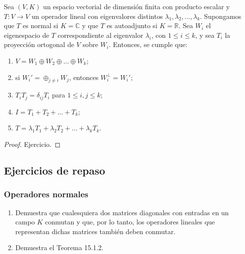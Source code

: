 \documentclass[12pt,dvipsnames]{article}
\newenvironment{teorema}[2][Teorema]{\begin{trivlist}
\item[\hskip \labelsep {\bfseries #1}\hskip \labelsep {\bfseries #2.}]}{\end{trivlist}}
\begin{document}
\begin{teorema} {15.3.1 (Teorema espectral)}
Sea $(V,K)$ un espacio vectorial de dimensión finita con producto escalar y $T:V\to V$ un operador lineal con eigenvalores distintos $\lambda_1,\lambda_2,...,\lambda_k$. Supongamos que $T$ es normal si $K=\mathbb{C}$ y que $T$ es autoadjunto si $K=\mathbb{R}$. Sea $W_i$ el eigenespacio de $T$ correspondiente al eigenvalor $\lambda_i$, con $1\leq i\leq k$, y sea $T_i$ la proyección ortogonal de $V$ sobre $W_i$. Entonces, se cumple que:
\begin{enumerate}[label=\alph*)]
    \item $V = W_1 \oplus W_2 \oplus ... \oplus W_k$;
    \item si $W_i'=\oplus_{j\neq i}W_j$, entonces $W_i^\perp=W_i'$;
    \item $T_i T_j = \delta_{ij}T_i$ para $1\leq i,j\leq k$;
    \item $I = T_1+T_2+...+T_k$;
    \item $T = \lambda_1 T_1 + \lambda_2 T_2 + ... + \lambda_k T_k$.
\end{enumerate}

\begin{proof}
    
    Ejercicio.

\end{proof}

\end{teorema}

\subsection{Ejercicios de repaso}

\subsubsection{Operadores normales}
\begin{enumerate}
    \item Demuestra que cualesquiera dos matrices diagonales con entradas en un campo $K$ conmutan y que, por lo tanto, los operadores lineales que representan dichas matrices también deben conmutar.
    \item Demuestra el Teorema 15.1.2.
\end{enumerate}
\end{document}
